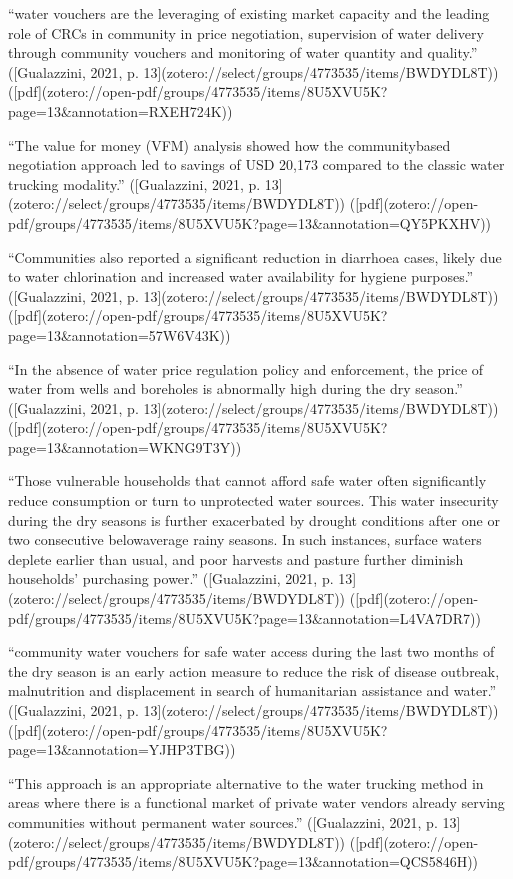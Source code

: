 {“water vouchers are the leveraging of existing market capacity and the leading role of CRCs in community in price negotiation, supervision of water delivery through community vouchers and monitoring of water quantity and quality.” ([Gualazzini, 2021, p. 13](zotero://select/groups/4773535/items/BWDYDL8T)) ([pdf](zotero://open-pdf/groups/4773535/items/8U5XVU5K?page=13&annotation=RXEH724K))

“The value for money (VFM) analysis showed how the communitybased negotiation approach led to savings of USD 20,173 compared to the classic water trucking modality.” ([Gualazzini, 2021, p. 13](zotero://select/groups/4773535/items/BWDYDL8T)) ([pdf](zotero://open-pdf/groups/4773535/items/8U5XVU5K?page=13&annotation=QY5PKXHV))

“Communities also reported a significant reduction in diarrhoea cases, likely due to water chlorination and increased water availability for hygiene purposes.” ([Gualazzini, 2021, p. 13](zotero://select/groups/4773535/items/BWDYDL8T)) ([pdf](zotero://open-pdf/groups/4773535/items/8U5XVU5K?page=13&annotation=57W6V43K))

“In the absence of water price regulation policy and enforcement, the price of water from wells and boreholes is abnormally high during the dry season.” ([Gualazzini, 2021, p. 13](zotero://select/groups/4773535/items/BWDYDL8T)) ([pdf](zotero://open-pdf/groups/4773535/items/8U5XVU5K?page=13&annotation=WKNG9T3Y))

“Those vulnerable households that cannot afford safe water often significantly reduce consumption or turn to unprotected water sources. This water insecurity during the dry seasons is further exacerbated by drought conditions after one or two consecutive belowaverage rainy seasons. In such instances, surface waters deplete earlier than usual, and poor harvests and pasture further diminish households’ purchasing power.” ([Gualazzini, 2021, p. 13](zotero://select/groups/4773535/items/BWDYDL8T)) ([pdf](zotero://open-pdf/groups/4773535/items/8U5XVU5K?page=13&annotation=L4VA7DR7))

“community water vouchers for safe water access during the last two months of the dry season is an early action measure to reduce the risk of disease outbreak, malnutrition and displacement in search of humanitarian assistance and water.” ([Gualazzini, 2021, p. 13](zotero://select/groups/4773535/items/BWDYDL8T)) ([pdf](zotero://open-pdf/groups/4773535/items/8U5XVU5K?page=13&annotation=YJHP3TBG))

“This approach is an appropriate alternative to the water trucking method in areas where there is a functional market of private water vendors already serving communities without permanent water sources.” ([Gualazzini, 2021, p. 13](zotero://select/groups/4773535/items/BWDYDL8T)) ([pdf](zotero://open-pdf/groups/4773535/items/8U5XVU5K?page=13&annotation=QCS5846H))

}
